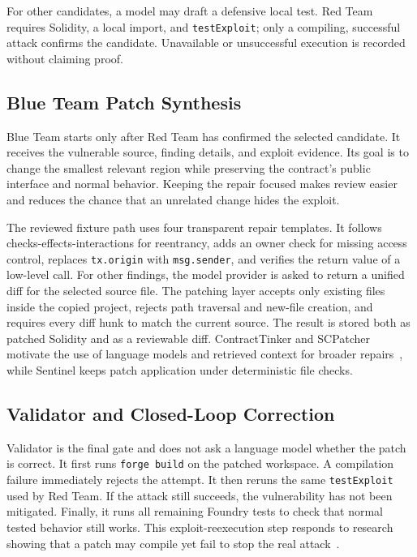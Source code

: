 \documentclass[conference,a4paper,10pt]{IEEEtran}
\newcommand{\code}[1]{\texttt{#1}}
\begin{document}
For other candidates, a model may draft a defensive local test. Red Team requires Solidity, a local import, and \code{testExploit}; only a compiling, successful attack confirms the candidate. Unavailable or unsuccessful execution is recorded without claiming proof.

\subsection{Blue Team Patch Synthesis}
Blue Team starts only after Red Team has confirmed the selected candidate. It receives the vulnerable source, finding details, and exploit evidence. Its goal is to change the smallest relevant region while preserving the contract's public interface and normal behavior. Keeping the repair focused makes review easier and reduces the chance that an unrelated change hides the exploit.

The reviewed fixture path uses four transparent repair templates. It follows checks-effects-interactions for reentrancy, adds an owner check for missing access control, replaces \code{tx.origin} with \code{msg.sender}, and verifies the return value of a low-level call. For other findings, the model provider is asked to return a unified diff for the selected source file. The patching layer accepts only existing files inside the copied project, rejects path traversal and new-file creation, and requires every diff hunk to match the current source. The result is stored both as patched Solidity and as a reviewable diff. ContractTinker and SCPatcher motivate the use of language models and retrieved context for broader repairs~\cite{contracttinker,scpatcher}, while Sentinel keeps patch application under deterministic file checks.

\subsection{Validator and Closed-Loop Correction}
Validator is the final gate and does not ask a language model whether the patch is correct. It first runs \code{forge build} on the patched workspace. A compilation failure immediately rejects the attempt. It then reruns the same \code{testExploit} used by Red Team. If the attack still succeeds, the vulnerability has not been mitigated. Finally, it runs all remaining Foundry tests to check that normal tested behavior still works. This exploit-reexecution step responds to research showing that a patch may compile yet fail to stop the real attack~\cite{mitigation}.
\end{document}
